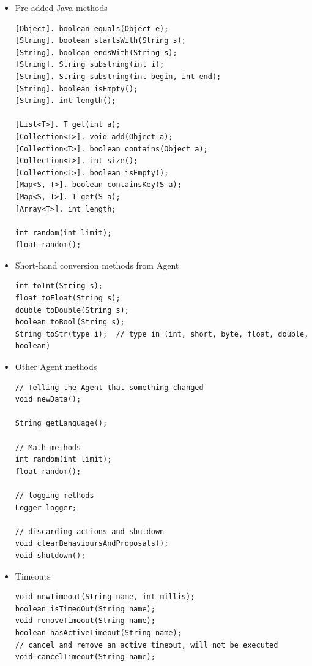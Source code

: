 \begin{itemize}
\item Pre-added Java methods
\begin{small}
\begin{lstlisting}
[Object]. boolean equals(Object e);
[String]. boolean startsWith(String s);
[String]. boolean endsWith(String s);
[String]. String substring(int i);
[String]. String substring(int begin, int end);
[String]. boolean isEmpty();
[String]. int length();

[List<T>]. T get(int a);
[Collection<T>]. void add(Object a);
[Collection<T>]. boolean contains(Object a);
[Collection<T>]. int size();
[Collection<T>]. boolean isEmpty();
[Map<S, T>]. boolean containsKey(S a);
[Map<S, T>]. T get(S a);
[Array<T>]. int length;

int random(int limit);
float random();
\end{lstlisting}
\end{small}

\item Short-hand conversion methods from Agent
\begin{small}
\begin{lstlisting}
int toInt(String s);
float toFloat(String s);
double toDouble(String s);
boolean toBool(String s);
String toStr(type i);  // type in (int, short, byte, float, double, boolean)
\end{lstlisting}
\end{small}

\item Other Agent methods
\begin{small}
\begin{lstlisting}
// Telling the Agent that something changed
void newData();

String getLanguage();

// Math methods
int random(int limit);
float random();

// logging methods
Logger logger;

// discarding actions and shutdown
void clearBehavioursAndProposals();
void shutdown();
\end{lstlisting}
\end{small}

\item Timeouts
\begin{small}
\begin{lstlisting}
void newTimeout(String name, int millis);
boolean isTimedOut(String name);
void removeTimeout(String name);
boolean hasActiveTimeout(String name);
// cancel and remove an active timeout, will not be executed
void cancelTimeout(String name);
\end{lstlisting}
\end{small}


\end{itemize}
